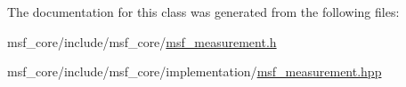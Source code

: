 The documentation for this class was generated from the following files\-:\begin{DoxyCompactItemize}
\item 
msf\-\_\-core/include/msf\-\_\-core/\hyperlink{msf__measurement_8h}{msf\-\_\-measurement.\-h}\item 
msf\-\_\-core/include/msf\-\_\-core/implementation/\hyperlink{msf__measurement_8hpp}{msf\-\_\-measurement.\-hpp}\end{DoxyCompactItemize}
